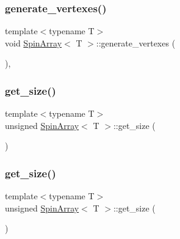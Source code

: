 \mbox{\label{classSpinArray_a9a91cd3d27cfd626edaaafe1cf2bc679}} 
\subsubsection{\texorpdfstring{generate\+\_\+vertexes()}{generate\_vertexes()}\hspace{0.1cm}{\footnotesize\ttfamily [4/4]}}
{\footnotesize\ttfamily template$<$typename T$>$ \\
void \mbox{\hyperlink{classSpinArray}{Spin\+Array}}$<$ T $>$\+::generate\+\_\+vertexes (\begin{DoxyParamCaption}{ }\end{DoxyParamCaption})\hspace{0.3cm}{\ttfamily [inline]}, {\ttfamily [private]}}

\mbox{\label{classSpinArray_ae7aa5d361c1f3024506291b04e027a7a}} 
\subsubsection{\texorpdfstring{get\+\_\+size()}{get\_size()}\hspace{0.1cm}{\footnotesize\ttfamily [1/4]}}
{\footnotesize\ttfamily template$<$typename T$>$ \\
unsigned \mbox{\hyperlink{classSpinArray}{Spin\+Array}}$<$ T $>$\+::get\+\_\+size (\begin{DoxyParamCaption}{ }\end{DoxyParamCaption})\hspace{0.3cm}{\ttfamily [inline]}}

\mbox{\label{classSpinArray_ae7aa5d361c1f3024506291b04e027a7a}} 
\subsubsection{\texorpdfstring{get\+\_\+size()}{get\_size()}\hspace{0.1cm}{\footnotesize\ttfamily [2/4]}}
{\footnotesize\ttfamily template$<$typename T$>$ \\
unsigned \mbox{\hyperlink{classSpinArray}{Spin\+Array}}$<$ T $>$\+::get\+\_\+size (\begin{DoxyParamCaption}{ }\end{DoxyParamCaption})\hspace{0.3cm}{\ttfamily [inline]}}

